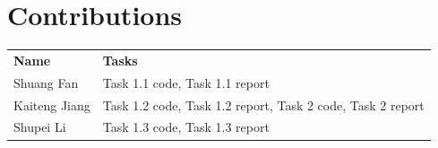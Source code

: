 \documentclass{article}
\begin{document}
\newpage
\section{Contributions}
\begin{table}[ht]
    \begin{tabular}{ll}
        \textbf{Name} & \textbf{Tasks}\\
        Shuang Fan & Task 1.1 code, Task 1.1 report\\
        Kaiteng Jiang & Task 1.2 code, Task 1.2 report, Task 2 code, Task 2 report\\
        Shupei Li & Task 1.3 code, Task 1.3 report\\
    \end{tabular}
\end{table}
\vspace{2cm}
\end{document}
